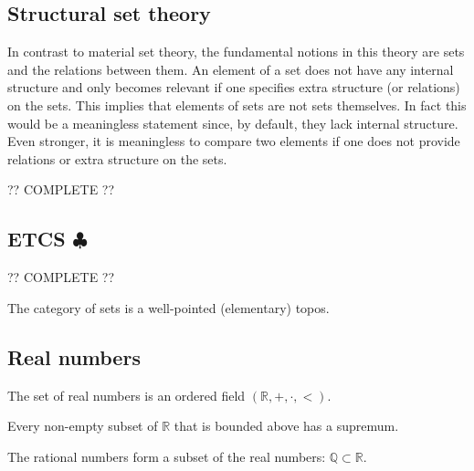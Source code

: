 \subsection{Structural set theory}

    In contrast to material set theory, the fundamental notions in this theory are sets and the relations between them. An element of a set does not have any internal structure and only becomes relevant if one specifies extra structure (or relations) on the sets. This implies that elements of sets are not sets themselves. In fact this would be a meaningless statement since, by default, they lack internal structure. Even stronger, it is meaningless to compare two elements if one does not provide relations or extra structure on the sets.

    ?? COMPLETE ??

\subsection{\texorpdfstring{ETCS $\clubsuit$}{ETCS}}

    ?? COMPLETE ??


    \begin{axiom}
        The category of sets is a well-pointed (elementary) topos.
    \end{axiom}

\subsection{Real numbers}

    \begin{axiom}[Ordering]
        The set of real numbers is an ordered field $(\mathbb{R},+,\cdot,<)$.
    \end{axiom}
    \begin{axiom}
        Every non-empty subset of $\mathbb{R}$ that is bounded above has a supremum.
    \end{axiom}

    \begin{axiom}
        The rational numbers form a subset of the real numbers: $\mathbb{Q}\subset\mathbb{R}$.
    \end{axiom}

